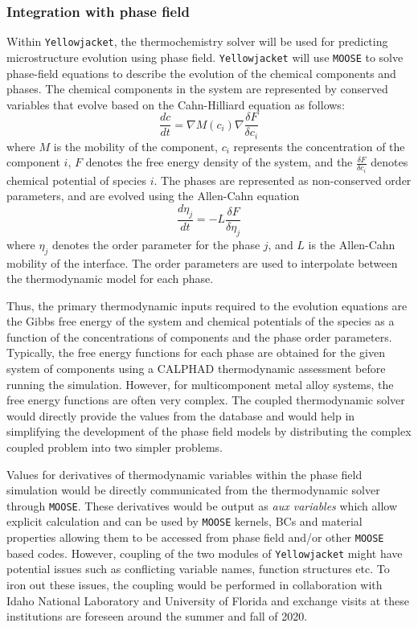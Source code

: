 	\subsubsection{Integration with phase field}
	Within \texttt{Yellowjacket}, the thermochemistry solver will be used for predicting microstructure evolution using phase field. \texttt{Yellowjacket} will use \texttt{MOOSE} to solve phase-field equations to describe the evolution of the chemical components and phases. The chemical components in the system are represented by conserved variables that evolve based on the Cahn-Hilliard equation as follows:
        \begin{equation}
            \frac{dc}{dt} = \nabla M\left(c_i\right) \nabla\frac{\delta F}{\delta c_i}
        \end{equation}
        where $M$ is the mobility of the component, $c_i$ represents the concentration of the component $i$, $F$ denotes the free energy density of the system, and the $\tfrac{\delta F}{\delta c_i}$ denotes chemical potential of species $i$. The phases are represented as non-conserved order parameters, and are evolved using the Allen-Cahn equation
        \begin{equation}
            \frac{d\eta_j}{dt} = -L \frac{\delta F}{\delta \eta_j}
        \end{equation}
        where $\eta_j$ denotes the order parameter for the phase $j$, and $L$ is the Allen-Cahn mobility of the interface. The order parameters are used to interpolate between the thermodynamic model for each phase.
        
        Thus, the primary thermodynamic inputs required to the evolution equations are the Gibbs free energy of the system and chemical potentials of the species as a function of the concentrations of components and the phase order parameters. Typically, the free energy functions for each phase are obtained for the given system of components using a CALPHAD thermodynamic assessment before running the simulation. However, for multicomponent metal alloy systems, the free energy functions are often very complex. The coupled thermodynamic solver would directly provide the values from the database and would help in simplifying the development of the phase field models by distributing the complex coupled problem into two simpler problems. 
        
        Values for derivatives of thermodynamic variables within the phase field simulation would be directly communicated from the thermodynamic solver through \texttt{MOOSE}. These derivatives would be output as \emph{aux variables} which allow explicit calculation and can be used by \texttt{MOOSE} kernels, BCs and material properties allowing them to be accessed from phase field and/or other \texttt{MOOSE} based codes. However, coupling of the two modules of \texttt{Yellowjacket} might have potential issues such as conflicting variable names, function structures etc. To iron out these issues, the coupling would be performed in collaboration with Idaho National Laboratory and University of Florida and exchange visits at these institutions are foreseen around the summer and fall of 2020.
				

